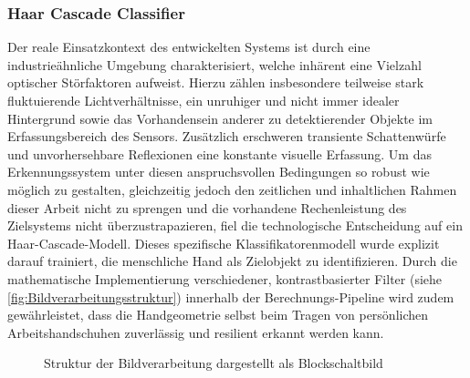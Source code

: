 \subsubsection{Haar Cascade Classifier}
Der reale Einsatzkontext des entwickelten Systems ist durch eine industrieähnliche Umgebung charakterisiert, welche inhärent eine Vielzahl optischer Störfaktoren aufweist. Hierzu zählen insbesondere teilweise stark fluktuierende Lichtverhältnisse, ein unruhiger und nicht immer idealer Hintergrund sowie das Vorhandensein anderer zu detektierender Objekte im Erfassungsbereich des Sensors. Zusätzlich erschweren transiente Schattenwürfe und unvorhersehbare Reflexionen eine konstante visuelle Erfassung. Um das Erkennungssystem unter diesen anspruchsvollen Bedingungen so robust wie möglich zu gestalten, gleichzeitig jedoch den zeitlichen und inhaltlichen Rahmen dieser Arbeit nicht zu sprengen und die vorhandene Rechenleistung des Zielsystems nicht überzustrapazieren, fiel die technologische Entscheidung auf ein Haar-Cascade-Modell. Dieses spezifische Klassifikatorenmodell wurde explizit darauf trainiert, die menschliche Hand als Zielobjekt zu identifizieren. Durch die mathematische Implementierung verschiedener, kontrastbasierter Filter (siehe \autoref{fig:Bildverarbeitungsstruktur}) innerhalb der Berechnungs-Pipeline wird zudem gewährleistet, dass die Handgeometrie selbst beim Tragen von persönlichen Arbeitshandschuhen zuverlässig und resilient erkannt werden kann.
\begin{figure}[h!]
	
	\centering
	\caption{Struktur der Bildverarbeitung dargestellt als Blockschaltbild}
	\label{fig:Bildverarbeitungsstruktur}
\end{figure}
